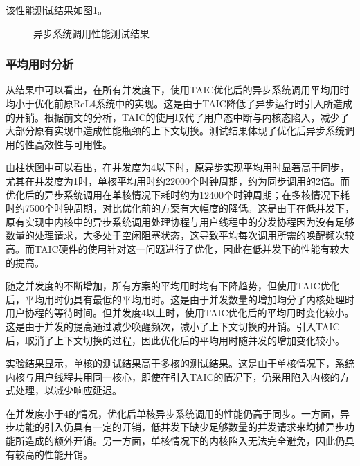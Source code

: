 该性能测试结果如图\ref{性能测试结果}。

\begin{figure}[htbp]
  \centering
  
  \caption{异步系统调用性能测试结果}\label{性能测试结果}
\end{figure}


\subsubsection{平均用时分析}

从结果中可以看出，在所有并发度下，使用TAIC优化后的异步系统调用平均用时均小于优化前原ReL4系统中的实现。这是由于TAIC降低了异步运行时引入所造成的开销。根据前文的分析，TAIC的使用取代了用户态中断与内核态陷入，减少了大部分原有实现中造成性能瓶颈的上下文切换。测试结果体现了优化后异步系统调用的性高效性与可用性。

由柱状图中可以看出，在并发度为4以下时，原异步实现平均用时显著高于同步，尤其在并发度为1时，单核平均用时约22000个时钟周期，约为同步调用的2倍。而优化后的异步系统调用在单核情况下耗时约为12400个时钟周期；在多核情况下耗时约7500个时钟周期，对比优化前的方案有大幅度的降低。这是由于在低并发下，原有实现中内核中的异步系统调用处理协程与用户线程中的分发协程因为没有足够数量的处理请求，大多处于空闲阻塞状态，这导致平均每次调用所需的唤醒频次较高。而TAIC硬件的使用针对这一问题进行了优化，因此在低并发下的性能有较大的提高。

随之并发度的不断增加，所有方案的平均用时均有下降趋势，但使用TAIC优化后，平均用时仍具有最低的平均用时。这是由于并发数量的增加均分了内核处理时用户协程的等待时间。但并发度4以上时，使用TAIC优化后的平均用时变化较小。这是由于并发的提高通过减少唤醒频次，减小了上下文切换的开销。引入TAIC后，取消了上下文切换的过程，因此优化后的平均用时随并发的增加变化较小。

实验结果显示，单核的测试结果高于多核的测试结果。这是由于单核情况下，系统内核与用户线程共用同一核心，即使在引入TAIC的情况下，仍采用陷入内核的方式处理，以减少响应延迟。

在并发度小于4的情况，优化后单核异步系统调用的性能仍高于同步。一方面，异步功能的引入仍具有一定的开销，低并发下缺少足够数量的并发请求来均摊异步功能所造成的额外开销。另一方面，单核情况下的内核陷入无法完全避免，因此仍具有较高的性能开销。

